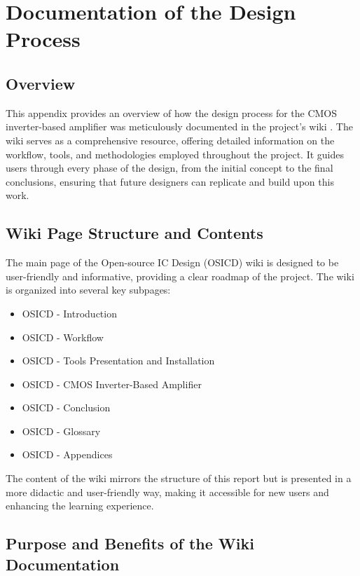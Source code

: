 \chapter{Documentation of the Design Process}
\label{AppendixB}

\section{Overview}

This appendix provides an overview of how the design process for the CMOS inverter-based amplifier was meticulously documented in the project's wiki \cite{ethz_BEL_wiki}. 
The wiki serves as a comprehensive resource, offering detailed information on the workflow, tools, and methodologies employed throughout the project. 
It guides users through every phase of the design, from the initial concept to the final conclusions, ensuring that future designers can replicate and build upon this work.


\section{Wiki Page Structure and Contents}

The main page of the Open-source IC Design (OSICD) wiki is designed to be user-friendly and informative, providing a clear roadmap of the project.
The wiki is organized into several key subpages:

\begin{itemize}
    \item OSICD - Introduction
    \item OSICD - Workflow
    \item OSICD - Tools Presentation and Installation
    \item OSICD - CMOS Inverter-Based Amplifier
    \item OSICD - Conclusion
    \item OSICD - Glossary
    \item OSICD - Appendices
\end{itemize}

The content of the wiki mirrors the structure of this report but is presented in a more didactic and user-friendly way, making it accessible for new users and enhancing the learning experience.

\section{Purpose and Benefits of the Wiki Documentation}

